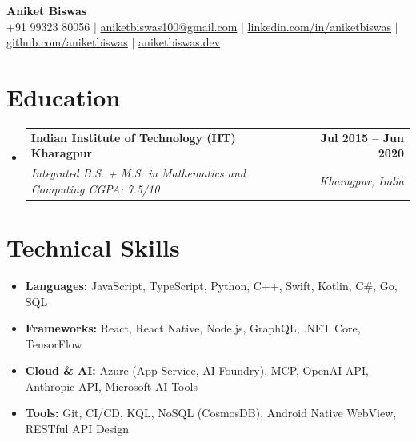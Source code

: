 \documentclass[a4paper,10pt]{article}
\makeatletter
\newcommand{\resumeSubheading}[4]{
  \vspace{-1pt}\item
  \begin{tabular*}{\textwidth}[t]{l@{\extracolsep{\fill}}r}
    \textbf{#1} & \textbf{#2} \\
    \textit{\small#3} & \textit{\small#4}
  \end{tabular*}\vspace{-6pt}
}
\makeatother
\begin{document}
\begin{center}
  {\huge\bfseries Aniket Biswas}\\[2pt]
  \small
  +91 99323 80056 $|$ \href{mailto:aniketbiswas100@gmail.com}{aniketbiswas100@gmail.com} $|$
  \href{https://linkedin.com/in/aniketbiswas}{linkedin.com/in/aniketbiswas} $|$
  \href{https://github.com/aniketbiswas}{github.com/aniketbiswas} $|$
  \href{https://aniketbiswas.dev}{aniketbiswas.dev}
\end{center}

\vspace{-10pt}

\section{Education}
\begin{itemize}
  \resumeSubheading{Indian Institute of Technology (IIT) Kharagpur}{Jul 2015 -- Jun 2020}{Integrated B.S. + M.S. in Mathematics and Computing \textnormal{\textbar{} CGPA: 7.5/10}}{Kharagpur, India}
\end{itemize}

\section{Technical Skills}
\begin{itemize}[nosep, leftmargin=*]
  \item \textbf{Languages:} JavaScript, TypeScript, Python, C++, Swift, Kotlin, C\#, Go, SQL
  \item \textbf{Frameworks:} React, React Native, Node.js, GraphQL, .NET Core, TensorFlow
  \item \textbf{Cloud \& AI:} Azure (App Service, AI Foundry), MCP, OpenAI API, Anthropic API, Microsoft AI Tools
  \item \textbf{Tools:} Git, CI/CD, KQL, NoSQL (CosmosDB), Android Native WebView, RESTful API Design
\end{itemize}
\end{document}
